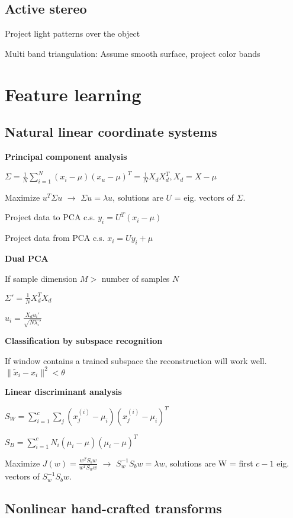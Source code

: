 \documentclass{article}
\begin{document}
\begin{multicols*}{2}
{\begin{compactenum}
	\end{compactenum}


	\subsection{Active stereo}

	Project light patterns over the object

	Multi band triangulation: Assume smooth surface, project color bands

	\section{Feature learning}

	\subsection{Natural linear coordinate systems}

	\textbf{Principal component analysis}

	$\Sigma = \frac{1}{N}\sum_{i=1}^{N}(x_i - \mu)(x_u - \mu)^T = \frac{1}{N}X_dX_d^T, X_d = X - \mu$

	Maximize $u^T\Sigma u$ $\rightarrow$ $\Sigma u = \lambda u$, solutions are $U$ = eig. vectors of $\Sigma$.

	Project data to PCA c.s. $y_i = U^T(x_i-\mu)$

	Project data from PCA c.s. $x_i = U y_i + \mu$

	\textbf{Dual PCA}

	If sample dimension $M >$  number of samples $N$

	$\Sigma' = \frac{1}{N}X_d^TX_d$

	$u_i = \frac{X_d u_i'}{\sqrt{N \lambda_i'}}$

	\textbf{Classification by subspace recognition}

	If window contains a trained subspace the reconstruction will work well. $\|\tilde{x}_i-x_i\|^2 < \theta$

	\textbf{Linear discriminant analysis}

	$S_W = \sum_{i=1}^{c}\sum_{j}(x_j^{(i)} - \mu_i)(x_j^{(i)} - \mu_i)^T$

	$S_B = \sum_{i=1}^{c}N_i(\mu_i - \mu)(\mu_i - \mu)^T$

	Maximize $J(w) = \frac{w^TS_bw}{w^TS_ww}$ $\rightarrow$ $S_w^{-1}S_bw=\lambda w$, solutions are W = first $c - 1$ eig. vectors of $S_w^{-1}S_bw$.

	\subsection{Nonlinear hand-crafted transforms}

}
\end{multicols*}
\end{document}

